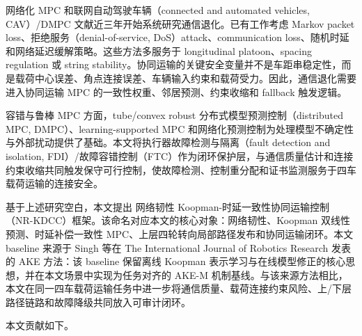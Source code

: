\documentclass[twocolumn,3p,times,procedia]{elsarticle}
\newif\ifNRReview
\newcommand{\reviewblock}[1]{\ifNRReview\par\smallskip\noindent\begingroup\setlength{\fboxsep}{4pt}\colorbox{yellow!35}{\parbox{0.96\linewidth}{\footnotesize\textbf{当前不足：} #1}}\endgroup\par\smallskip\fi}
\newcommand{\AKE}{AKE-M}
\newcommand{\Method}{NR-KDCC}
\newcommand{\MethodCN}{网络韧性 Koopman-时延一致性协同运输控制}
\begin{document}
网络化 MPC 和联网自动驾驶车辆（connected and automated vehicles, CAV）/DMPC 文献近三年开始系统研究通信退化。已有工作考虑 Markov packet loss、拒绝服务（denial-of-service, DoS）attack、communication loss、随机时延和网络延迟缓解策略\cite{bian2025markovPacketLossDMPC,dosDMPC2024isa,robustCommunicationLoss2025trb,bao2024robustUkfMpc,networkLatencyCav2024sensors,dai2024networkedPredictiveControl}。这些方法多服务于 longitudinal platoon、spacing regulation 或 string stability。协同运输的关键安全变量并不是车距串稳定性，而是载荷中心误差、角点连接误差、车辆输入约束和载荷受力。因此，通信退化需要进入协同运输 MPC 的一致性权重、邻居预测、约束收缩和 fallback 触发逻辑。

容错与鲁棒 MPC 方面，tube/convex robust 分布式模型预测控制（distributed MPC, DMPC）、learning-supported MPC 和网络化预测控制为处理模型不确定性与外部扰动提供了基础\cite{convexRobustDMPC2025ejc,gasparino2023nnMpcUncertainty,dai2024networkedPredictiveControl}。本文将执行器故障检测与隔离（fault detection and isolation, FDI）/故障容错控制（FTC）作为闭环保护层，与通信质量估计和连接约束收缩共同触发保守可行控制，使故障检测、控制重分配和证书监测服务于四车载荷运输的连接安全。
\reviewblock{FDI/FTC 近三年直接对标文献和多 seed 检测延迟统计仍需扩充；当前主文中应把它写作闭环保护增强模块，而不写作独立超越 FTC 文献的理论贡献。}

基于上述研究空白，本文提出 \MethodCN{}（\Method{}）框架。该命名对应本文的核心对象：网络韧性、Koopman 双线性预测、时延补偿一致性 MPC、上层四轮转向局部路径发布和协同运输闭环。本文 baseline 来源于 Singh 等在 The International Journal of Robotics Research 发表的 AKE 方法\cite{singh2025adaptiveKoopman}：该 baseline 保留离线 Koopman 表示学习与在线模型修正的核心思想，并在本文场景中实现为任务对齐的 \AKE{} 机制基线。与该来源方法相比，本文在同一四车载荷运输任务中进一步将通信质量、载荷连接约束风险、上/下层路径链路和故障降级共同放入可审计闭环。
\reviewblock{当前主基线是任务对齐的 \AKE{} 机制基线，不是上传原文 AKE-A 的完整复现；投稿前若要强化顶刊说服力，需要补严格 AKE-A 复现或强物理/DMPC baseline。}

本文贡献如下。
\end{document}
